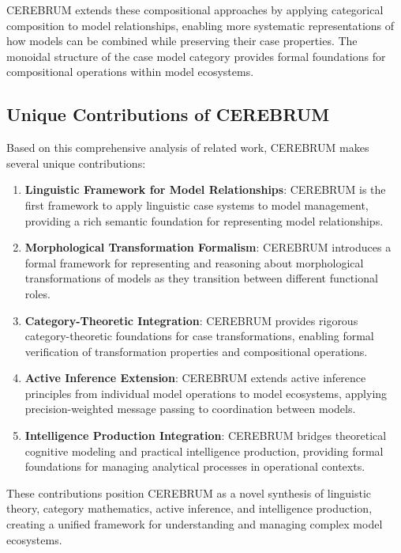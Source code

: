 \documentclass[
  11pt,
  letterpaper,
]{article}
\begin{document}
CEREBRUM extends these compositional approaches by applying categorical
composition to model relationships, enabling more systematic
representations of how models can be combined while preserving their
case properties. The monoidal structure of the case model category
provides formal foundations for compositional operations within model
ecosystems.

\hypertarget{unique-contributions-of-cerebrum}{%
\subsection{Unique Contributions of
CEREBRUM}\label{unique-contributions-of-cerebrum}}

Based on this comprehensive analysis of related work, CEREBRUM makes
several unique contributions:

\begin{enumerate}
\def\labelenumi{\arabic{enumi}.}
\item
  \textbf{Linguistic Framework for Model Relationships}: CEREBRUM is the
  first framework to apply linguistic case systems to model management,
  providing a rich semantic foundation for representing model
  relationships.
\item
  \textbf{Morphological Transformation Formalism}: CEREBRUM introduces a
  formal framework for representing and reasoning about morphological
  transformations of models as they transition between different
  functional roles.
\item
  \textbf{Category-Theoretic Integration}: CEREBRUM provides rigorous
  category-theoretic foundations for case transformations, enabling
  formal verification of transformation properties and compositional
  operations.
\item
  \textbf{Active Inference Extension}: CEREBRUM extends active inference
  principles from individual model operations to model ecosystems,
  applying precision-weighted message passing to coordination between
  models.
\item
  \textbf{Intelligence Production Integration}: CEREBRUM bridges
  theoretical cognitive modeling and practical intelligence production,
  providing formal foundations for managing analytical processes in
  operational contexts.
\end{enumerate}

These contributions position CEREBRUM as a novel synthesis of linguistic
theory, category mathematics, active inference, and intelligence
production, creating a unified framework for understanding and managing
complex model ecosystems.
\end{document}
